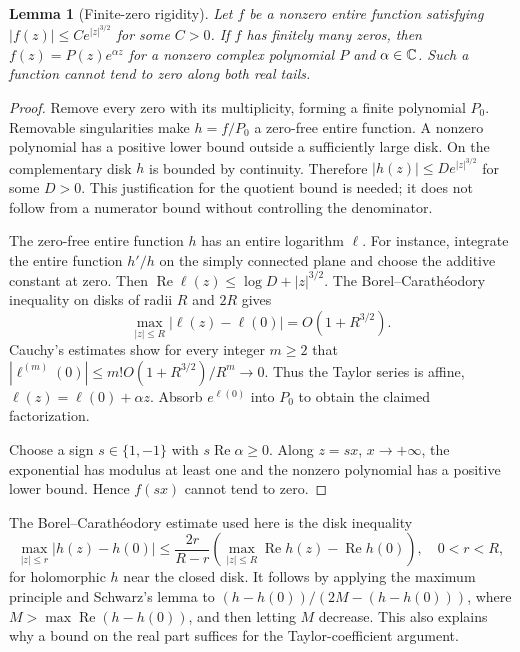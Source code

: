 \documentclass[11pt]{article}
\newtheorem{lemma}[theorem]{Lemma}
\theoremstyle{remark}\newtheorem{remark}[theorem]{Remark}
\begin{document}
\begin{lemma}[Finite-zero rigidity]\label{lem:finitezeros}
Let $f$ be a nonzero entire function satisfying
$|f(z)|\leq C e^{|z|^{3/2}}$ for some $C>0$. If $f$ has finitely
many zeros, then $f(z)=P(z)e^{\alpha z}$ for a nonzero complex
polynomial $P$ and $\alpha\in\mathbb C$. Such a function cannot tend to
zero along both real tails.
\end{lemma}
\begin{proof}
Remove every zero with its multiplicity, forming a finite polynomial
$P_0$. Removable singularities make $h=f/P_0$ a zero-free entire
function. A nonzero polynomial has a positive lower bound outside
a sufficiently large disk. On the complementary disk $h$ is bounded
by continuity. Therefore $|h(z)|\leq D e^{|z|^{3/2}}$ for some $D>0$.
This justification for the quotient bound is needed; it does not
follow from a numerator bound without controlling the denominator.

The zero-free entire function $h$ has an entire logarithm $\ell$.
For instance, integrate the entire function $h'/h$ on the simply
connected plane and choose the additive constant at zero. Then
$\operatorname{Re}\ell(z)\leq\log D+|z|^{3/2}$.
The Borel--Carath\'eodory inequality on disks of radii $R$ and $2R$
gives
\[
 \max_{|z|\leq R}|\ell(z)-\ell(0)|=O(1+R^{3/2}).
\]
Cauchy's estimates show for every integer $m\geq2$ that
$|\ell^{(m)}(0)|\leq m!O(1+R^{3/2})/R^m\to0$.
Thus the Taylor series is affine, $\ell(z)=\ell(0)+\alpha z$.
Absorb $e^{\ell(0)}$ into $P_0$ to obtain the claimed factorization.

Choose a sign $s\in\{1,-1\}$ with $s\operatorname{Re}\alpha\geq0$.
Along $z=sx$, $x\to+\infty$, the exponential has modulus at least
one and the nonzero polynomial has a positive lower bound. Hence
$f(sx)$ cannot tend to zero.
\end{proof}

The Borel--Carath\'eodory estimate used here is the disk inequality
\[
 \max_{|z|\leq r}|h(z)-h(0)|
 \leq\frac{2r}{R-r}
 \left(\max_{|z|\leq R}\operatorname{Re}h(z)
       -\operatorname{Re}h(0)\right),\quad 0<r<R,
\]
for holomorphic $h$ near the closed disk. It follows by applying the
maximum principle and Schwarz's lemma to
$(h-h(0))/(2M-(h-h(0)))$, where
$M>\max\operatorname{Re}(h-h(0))$, and then letting $M$ decrease.
This also explains why a bound on the real part suffices for the
Taylor-coefficient argument.
\end{document}
